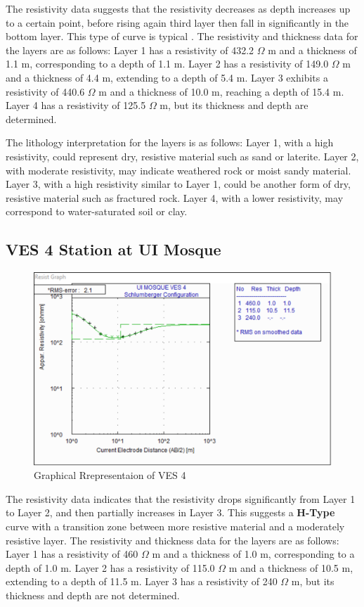 \documentclass[12pt,a4paper]{report}
\begin{document}
The resistivity data suggests that the resistivity decreases as depth increases up to a certain point, before rising again third layer then fall in significantly in the bottom layer. This type of curve is typical . The resistivity and thickness data for the layers are as follows: Layer 1 has a resistivity of 432.2 $\Omega$ m and a thickness of 1.1 m, corresponding to a depth of 1.1 m. Layer 2 has a resistivity of 149.0 $\Omega$ m and a thickness of 4.4 m, extending to a depth of 5.4 m. Layer 3 exhibits a resistivity of 440.6 $\Omega$ m and a thickness of 10.0 m, reaching a depth of 15.4 m. Layer 4 has a resistivity of 125.5 $\Omega$ m, but its thickness and depth are determined.

The lithology interpretation for the layers is as follows: Layer 1, with a high resistivity, could represent dry, resistive material such as sand or laterite. Layer 2, with moderate resistivity, may indicate weathered rock or moist sandy material. Layer 3, with a high resistivity similar to Layer 1, could be another form of dry, resistive material such as fractured rock. Layer 4, with a lower resistivity, may correspond to water-saturated soil or clay.

\subsection{VES 4 Station at UI Mosque}

\begin{figure}[H]
    \centering
    \includegraphics[width=1.0\textwidth]{ui_ves4.png}
    \caption{Graphical Rrepresentaion of VES 4}
    \label{fig:VES_4_Curve}
\end{figure}

The resistivity data indicates that the resistivity drops significantly from Layer 1 to Layer 2, and then partially increases in Layer 3. This suggests a \textbf{H-Type} curve with a transition zone between more resistive material and a moderately resistive layer. The resistivity and thickness data for the layers are as follows: Layer 1 has a resistivity of 460 $\Omega$ m and a thickness of 1.0 m, corresponding to a depth of 1.0 m. Layer 2 has a resistivity of 115.0 $\Omega$ m and a thickness of 10.5 m, extending to a depth of 11.5 m. Layer 3 has a resistivity of 240 $\Omega$ m, but its thickness and depth are not determined.
\end{document}
